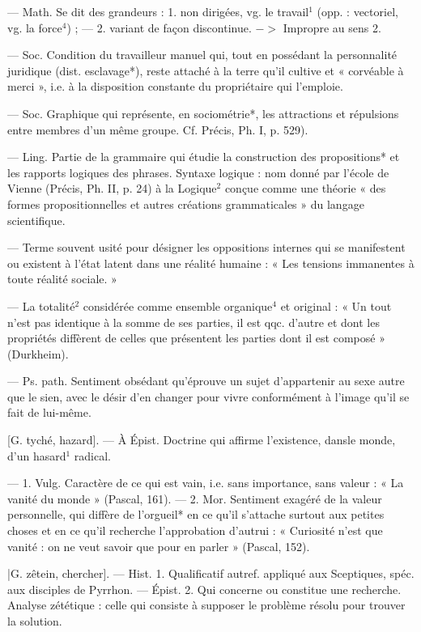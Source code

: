 \begin{itemize}[leftmargin=1cm, label=, itemsep=1pt]
 — Math. Se dit des grandeurs : 1. non dirigées, vg. le travail$^1$ (opp. : vectoriel, vg. la force$^4$) ;
— 2. variant de façon discontinue.
$->$ Impropre au sens 2.

 — Soc. Condition du travailleur manuel qui, tout en possédant la personnalité juridique
(dist. esclavage*), reste attaché à
la terre qu'il cultive et « corvéable
à merci », i.e. à la disposition
constante du propriétaire qui l’emploie.

 — Soc. Graphique qui
représente, en sociométrie*, les
attractions et répulsions entre
membres d’un même groupe. Cf.
Précis, Ph. I, p. 529).

 — Ling. Partie de la grammaire qui étudie la construction
des propositions* et les rapports
logiques des phrases. Syntaxe logique : nom donné par l’école de
Vienne (Précis, Ph. II, p. 24) à la
Logique$^2$ conçue comme une théorie « des formes propositionnelles
et autres créations grammaticales »
du langage scientifique.

 — Terme souvent usité
pour désigner les oppositions internes qui se manifestent ou existent à l’état latent dans une réalité
humaine : « Les tensions immanentes à toute réalité sociale. »

 — La totalité$^2$ considérée
comme ensemble organique$^4$ et
original : « Un tout n’est pas identique à la somme de ses parties,
il est qqc. d’autre et dont les propriétés diffèrent de celles que présentent les parties dont il est composé » (Durkheim).

 — Ps. path. Sentiment obsédant qu’éprouve un sujet
d’appartenir au sexe autre que le
sien, avec le désir d'en changer
pour vivre conformément à l’image
qu'il se fait de lui-même.

 [G. tyché, hazard]. —
À Épist. Doctrine qui affirme l’existence, dansle monde, d’un hasard$^1$
radical.

 — 1. Vulg. Caractère de ce
qui est vain, i.e. sans importance,
sans valeur : « La vanité du
monde » (Pascal, 161). — 2. Mor.
Sentiment exagéré de la valeur
personnelle, qui diffère de l’orgueil*
en ce qu'il s'attache surtout aux
petites choses et en ce qu'il recherche l'approbation d'autrui : « Curiosité n’est que vanité : on ne veut
savoir que pour en parler » (Pascal,
152).

 |G. zêtein, chercher]. — Hist.
1. Qualificatif autref. appliqué aux
Sceptiques, spéc. aux disciples de
Pyrrhon. — Épist. 2. Qui concerne
ou constitue une recherche. Analyse zététique : celle qui consiste à
supposer le problème résolu pour
trouver la solution.

	\end{itemize}
